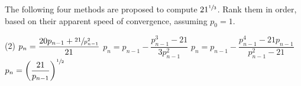 \documentclass[../../../../Assignments]{subfiles}
\begin{document}
\begin{exercise}
    The following four methods are proposed to compute \(21^{\sfrac{1}{3}}\).
    Rank them in order, based on their apparent speed of convergence, assuming
    \(p_0 = 1\).

    \begin{tasks}(2)
        \task \(p_n = \dfrac{20 p_{n - 1} + \sfrac{21}{p_{n - 1}^2}}{21}\)               \label{exer:2.2.3:a}
        \task \(p_n = p_{n - 1} - \dfrac{p_{n - 1}^3 - 21}{3 p_{n - 1}^2}\)              \label{exer:2.2.3:b}
        \task \(p_n = p_{n - 1} - \dfrac{p_{n - 1}^4 - 21 p_{n - 1}}{p_{n - 1}^2 - 21}\) \label{exer:2.2.3:c}
        \task \(p_n = \left(\dfrac{21}{p_{n-1}}\right)^{\sfrac{1}{2}}\)                  \label{exer:2.2.3:d}
    \end{tasks}
\end{exercise}
\end{document}
